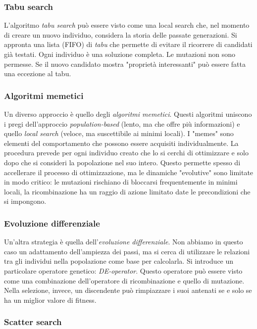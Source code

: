 \documentclass[10pt,a4paper]{article}
\begin{document}
\subsubsection{Tabu search}

L'algoritmo \emph{tabu search} può essere visto come una local search che, nel momento di creare un nuovo individuo, considera la storia delle passate generazioni. Si appronta una lista (FIFO) di \emph{tabu} che permette di evitare il ricorrere di candidati già testati. Ogni individuo è una soluzione completa. Le mutazioni non sono permesse. Se il nuovo candidato mostra "proprietà interessanti" può essere fatta una eccezione al tabu.

\subsubsection{Algoritmi memetici}

Un diverso approccio è quello degli \emph{algoritmi memetici}. Questi algoritmi uniscono i pregi dell'approccio \emph{population-based} (lento, ma che offre più informazioni) e quello \emph{local search} (veloce, ma suscettibile ai minimi locali). I "memes" sono elementi del comportamento che possono essere acquisiti individualmente. La procedura prevede per ogni individuo creato che lo si cerchi di ottimizzare e solo dopo che si consideri la popolazione nel suo intero. Questo permette spesso di accellerare il processo di ottimizzazione, ma le dinamiche "evolutive" sono limitate in modo critico: le mutazioni rischiano di bloccarsi frequentemente in minimi locali, la ricombinazione ha un raggio di azione limitato date le precondizioni che si impongono. 

\subsubsection{Evoluzione differenziale}

Un'altra strategia è quella dell'\emph{evoluzione differenziale}. Non abbiamo in questo caso un adattamento dell'ampiezza dei passi, ma si cerca di utilizzare le relazioni tra gli individui nella popolazione come base per calcolarla. Si introduce un particolare operatore genetico: \emph{DE-operator}. Questo operatore può essere visto come una combinazione dell'operatore di ricombinazione e quello di mutazione. Nella selezione, invece, un discendente può rimpiazzare i suoi antenati se e solo se ha un miglior valore di fitness. 

\subsubsection{Scatter search}
\end{document}
